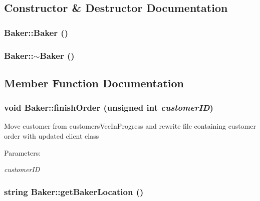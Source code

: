 \subsection{Constructor \& Destructor Documentation}
\hypertarget{class_baker_e162daa1f48200ac1b0470ea143378af}{
\subsubsection[Baker]{\setlength{\rightskip}{0pt plus 5cm}Baker::Baker ()}}
\label{class_baker_e162daa1f48200ac1b0470ea143378af}


\hypertarget{class_baker_aca71cde6b6b1e6315b980d299ed63ba}{
\subsubsection[$\sim$Baker]{\setlength{\rightskip}{0pt plus 5cm}Baker::$\sim$Baker ()}}
\label{class_baker_aca71cde6b6b1e6315b980d299ed63ba}




\subsection{Member Function Documentation}
\hypertarget{class_baker_222a16bf113b70cbe0388a7291978a57}{
\subsubsection[finishOrder]{\setlength{\rightskip}{0pt plus 5cm}void Baker::finish\-Order (unsigned int {\em customer\-ID})}}
\label{class_baker_222a16bf113b70cbe0388a7291978a57}


Move customer from customers\-Vec\-In\-Progress and rewrite file containing customer order with updated client class

\begin{Desc}
\item[Parameters:]
\begin{description}
\item[{\em customer\-ID}]\end{description}
\end{Desc}
\hypertarget{class_baker_363b0d0c242923ca3a76ebd4e608cc2d}{
\subsubsection[getBakerLocation]{\setlength{\rightskip}{0pt plus 5cm}string Baker::get\-Baker\-Location ()}}
\label{class_baker_363b0d0c242923ca3a76ebd4e608cc2d}


